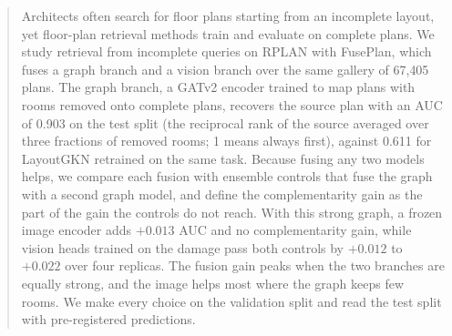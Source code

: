 \begin{abstract}
Architects often search for floor plans starting from an incomplete layout, yet floor-plan retrieval methods train and evaluate on complete plans.
We study retrieval from incomplete queries on RPLAN with FusePlan, which fuses a graph branch and a vision branch over the same gallery of 67{,}405 plans.
The graph branch, a GATv2 encoder trained to map plans with rooms removed onto complete plans, recovers the source plan with an AUC of 0.903 on the test split (the reciprocal rank of the source averaged over three fractions of removed rooms; 1 means always first), against 0.611 for LayoutGKN retrained on the same task.
Because fusing any two models helps, we compare each fusion with ensemble controls that fuse the graph with a second graph model, and define the complementarity gain as the part of the gain the controls do not reach.
With this strong graph, a frozen image encoder adds $+0.013$ AUC and no complementarity gain, while vision heads trained on the damage pass both controls by $+0.012$ to $+0.022$ over four replicas.
The fusion gain peaks when the two branches are equally strong, and the image helps most where the graph keeps few rooms.
We make every choice on the validation split and read the test split with pre-registered predictions.
\end{abstract}
